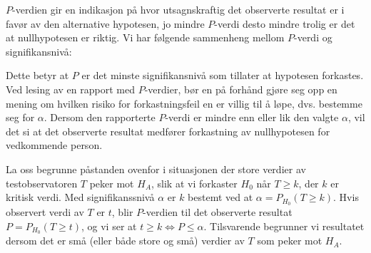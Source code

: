 \begin{center}  \end{center}

\noindent $P$-verdien gir en indikasjon på hvor utsagnskraftig det
observerte resultat er i favør av den alternative hypotesen, jo
mindre $P$-verdi desto mindre trolig er det at nullhypotesen er riktig.
Vi har følgende sammenheng mellom $P$-verdi og signifikansnivå: 

\begin{center}  \end{center}

\noindent Dette betyr at $P$ er det minste signifikansnivå som tillater at
hypotesen forkastes. Ved lesing av en  rapport med $P$-verdier, bør en 
på forhånd gjøre seg opp en mening om hvilken 
 risiko for forkastningsfeil en er villig til å løpe,
dvs. bestemme seg for $\alpha$.
Dersom den rapporterte $P$-verdi er mindre enn eller lik den valgte
$\alpha$, vil det si at det observerte resultat medfører
forkastning av nullhypotesen for vedkommende person.

La oss begrunne påstanden ovenfor i situasjonen der store verdier av
testobservatoren $T$ peker mot $H_A$, slik at vi forkaster $H_0$
når $T\geq k$, der $k$ er kritisk verdi. Med
signifikanssnivå $\alpha$ er $k$ bestemt ved at
 $\alpha = P_{H_0} (T\geq k)$. Hvis observert verdi av $T$ er $t$, blir
 $P$-verdien til det observerte resultat $ P=P_{H_0} (T\geq t) $, og vi ser at
 $t\geq k  \Leftrightarrow  P\leq \alpha$.
Tilsvarende begrunner vi resultatet dersom det er små
(eller både store og små) verdier av $T$ som peker mot $H_A$. \\

